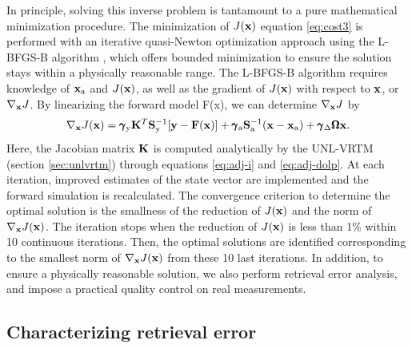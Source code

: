 In principle, solving this inverse problem is tantamount to a pure
mathematical minimization procedure. The minimization of $J(\mathbf{x})$
equation \eqref{eq:cost3}  is performed with an iterative 
quasi-Newton optimization approach using the L-BFGS-B algorithm 
\citep{Byrd95, Zhu94}, which offers bounded minimization to ensure 
the solution stays within a physically reasonable range. 
The L-BFGS-B algorithm requires knowledge of $\mathbf{x}_\text{a}$ and
$J(\mathbf{x})$, as well as the gradient of $J(\mathbf{x})$ with respect to $\mathbf{x}$,
or $\nabla_{\mathbf{x}}J$. By linearizing the forward model F(x), we can 
determine $\nabla_{\mathbf{x}}J$ by 
\begin{equation}
\nabla_{\mathbf{x}}J(\mathbf{x}) = 
   \pmb{\gamma}_\text{y}\mathbf{K}^T\mathbf{S}_\text{y}^{-1}[\mathbf{y}-\mathbf{F}(\mathbf{x})] +
   \pmb{\gamma}_\text{a}\mathbf{S}_\text{a}^{-1}(\mathbf{x}-\mathbf{x}_\text{a}) +
   \pmb{\gamma}_\Delta\pmb{\Omega}\mathbf{x}.
\label{eq:costadj}
\end{equation}
Here, the Jacobian matrix $\mathbf{K}$ is computed analytically by the
UNL-VRTM (section \ref{sec:unlvrtm}) through equations \eqref{eq:adj-i} and 
\eqref{eq:adj-dolp}. At each iteration, improved estimates of the state vector
are implemented and the forward simulation is recalculated. The
convergence criterion to determine the optimal solution is the smallness
of the reduction of $J(\mathbf{x})$ and the norm of $\nabla_{\mathbf{x}}J(\mathbf{x})$. 
The iteration stops when the reduction of $J(\mathbf{x})$ is less than 1\% 
within 10 continuous iterations. Then, the optimal solutions are 
identified corresponding to the smallest norm of $\nabla_{\mathbf{x}}J(\mathbf{x})$ from 
these 10 last iterations. In addition, to ensure a
physically reasonable solution, we also perform retrieval error
analysis, and impose a practical quality control on real measurements. 

\subsection{Characterizing retrieval error}
\label{subsec:alg-error}

